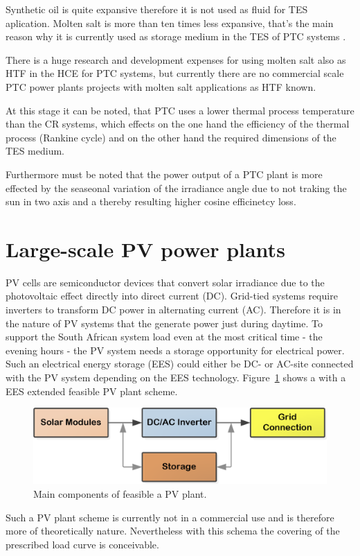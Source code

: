 Synthetic oil is quite expansive therefore it is not used as fluid for TES aplication. Molten salt is more than ten times less expansive, that's the main reason why it is currently used as storage medium in the TES of PTC systems \cite{Gil2010}. 

There is a huge research and development expenses for using molten salt also as HTF in the HCE for PTC systems, but currently there are no commercial scale PTC power plants projects with molten salt applications as HTF known. \cite{Maccari2015}

At this stage it can be noted, that PTC uses a lower thermal process temperature than the CR systems, which effects on the one hand the efficiency of the thermal process (Rankine cycle) and on the other hand the required dimensions of the TES medium. 

Furthermore must be noted that the power output of a PTC plant is more effected by the seaseonal variation of the irradiance angle due to not traking the sun in two axis and a thereby resulting higher cosine efficinetcy loss. \cite{Jorgenson2013}

\pagebreak
\section{Large-scale PV power plants}\label{Large scale photo voltaic (PV) power plants}
PV cells are semiconductor devices that convert solar irradiance due to the photovoltaic effect directly into direct current (DC).
Grid-tied systems require inverters to transform DC power in alternating current (AC). Therefore it is in the nature of PV systems that the generate power just during daytime. To support the South African system load even at the most critical time - the evening hours - the PV system needs a storage opportunity for electrical power. Such an electrical energy storage (EES) could either be DC- or AC-site connected with the PV system depending on the EES technology. Figure~\ref{PVMainComp} shows a with a EES extended feasible PV plant scheme.

\begin{figure}[!h] 
\centering
\includegraphics[width=0.75\linewidth]{FIG/PVMainComp}
\caption[Main components of feasible a PV plant.]{Main components of feasible a PV plant.}\label{PVMainComp}
\end{figure}
Such a PV plant scheme is currently not in a commercial use and is therefore more of theoretically nature. Nevertheless with this schema the covering of the prescribed load curve is conceivable.
